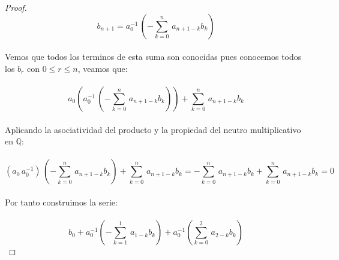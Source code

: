 \documentclass[11pt,letterpaper]{article}
\newcommand{\Q}{\mathbb{Q}}
\begin{document}
\begin{proof}
    \,\\
    \begin{equation*}
        b_{n+1}=a_0^{-1}\,\left(-\sum_{k=0}^{n}\,a_{n+1-k}b_k\right)
    \end{equation*}\,\\
    Vemos que todos los terminos de esta suma son conocidas pues conocemos todos los $b_r$ con $0\leq r\leq n$, veamos que:\,\\
    \,\\
    \begin{equation*}
        a_0\left(a_0^{-1}\,\left(-\sum_{k=0}^{n}\,a_{n+1-k}b_k\right)\right)+\sum_{k=0}^{n}\,a_{n+1-k}b_k
    \end{equation*}\,\\
    Aplicando la asociatividad del producto y la propiedad del neutro multiplicativo  en $\Q$:\,\\
    \,\\
    \begin{equation*}
        (a_0\,a_0^{-1})\,\left(-\sum_{k=0}^{n}\,a_{n+1-k}b_k\right)+\sum_{k=0}^{n}\,a_{n+1-k}b_k=-\sum_{k=0}^{n}\,a_{n+1-k}b_k+\sum_{k=0}^{n}\,a_{n+1-k}b_k=0
    \end{equation*}\,\\
    Por tanto construimos la serie:\,\\
    \,\\
    \begin{equation*}
        b_0+a_0^{-1}\left(-\sum_{k=1}^{1}\,a_{1-k}b_k\right)+a_0^{-1}\left(\sum_{k=0}^{2}\,a_{2-k}b_k\right)
    \end{equation*}
    
\end{proof}
\end{document}
